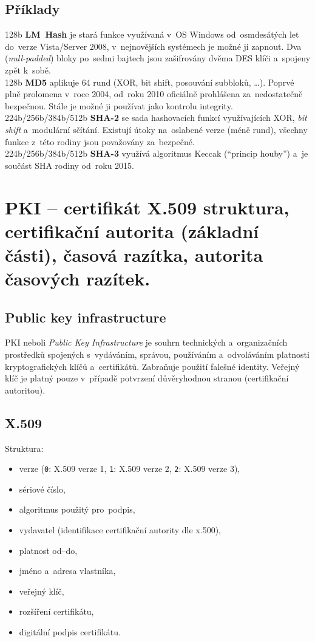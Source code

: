 \subsection{Příklady}

128b \textbf{LM~Hash} je stará funkce využívaná v~OS Windows od~osmdesátých let do~verze Vista/Server 2008, v~nejnovějších systémech je možné ji zapnout. Dva (\emph{null-padded}) bloky po~sedmi bajtech jsou zašifrovány dvěma DES klíči a~spojeny zpět k~sobě. \\
128b \textbf{MD5} aplikuje 64 rund (XOR, bit shift, posouvání subbloků, \dots). Poprvé plně prolomena v~roce 2004, od~roku 2010 oficiálně prohlášena za~nedostatečně bezpečnou. Stále je možné ji používat jako kontrolu integrity. \\
224b/256b/384b/512b \textbf{SHA-2} se sada hashovacích funkcí využívajících XOR, \emph{bit shift} a~modulární sčítání. Existují útoky na~oslabené verze (méně rund), všechny funkce z~této rodiny jsou považovány za~bezpečné. \\
224b/256b/384b/512b \textbf{SHA-3} využívá algoritmus Keccak (\enquote{princip houby}) a~je součást SHA rodiny od~roku 2015.

\clearpage
\section{PKI -- certifikát X.509 struktura, certifikační autorita (základní části), časová razítka, autorita časových razítek.}

\subsection{Public key infrastructure}

PKI neboli \emph{Public Key Infrastructure} je souhrn technických a~organizačních prostředků spojených s~vydáváním, správou, používáním a~odvoláváním platnosti kryptografických klíčů a~certifikátů. Zabraňuje použití falešné identity. Veřejný klíč je platný pouze v~případě potvrzení důvěryhodnou stranou (certifikační autoritou).

\subsection{X.509}
Struktura:
\begin{itemize}[noitemsep]
    \item verze (\texttt{0}: X.509 verze 1, \texttt{1}: X.509 verze 2, \texttt{2}: X.509 verze 3),
    \item sériové číslo,
    \item algoritmus použitý pro~podpis,
    \item vydavatel (identifikace certifikační autority dle x.500),
    \item platnost od--do,
    \item jméno a~adresa vlastníka,
    \item veřejný klíč,
    \item rozšíření certifikátu,
    \item digitální podpis certifikátu.
\end{itemize}

